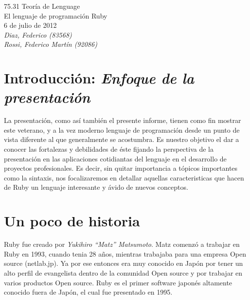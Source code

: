\documentclass{article}
\begin{document}
\begin{titlepage}
	\vspace*{\fill}
	\begin{center}
		\huge 75.31 Teoría de Lenguage \\ 
		\Huge El lenguaje de programación Ruby \\
		\bigskip \Large 6 de julio de 2012 \\
		\bigskip\bigskip \large\textit{Diaz, Federico (83568)\\Rossi, Federico Martín (92086)}
		\date{}
	\end{center}
	\vspace*{\fill}
\end{titlepage}
\newpage


\tableofcontents
\newpage


\section{Introducción: \textit{Enfoque de la presentación}}

La presentación, como así también el presente informe, tienen como fin mostrar este veterano, y a la vez moderno lenguaje de programación desde un punto de vista diferente al que generalmente se acostumbra. Es nuestro objetivo el dar a conocer las fortalezas y debilidades de éste fijando la perspectiva de la presentación en las aplicaciones cotidiantas del lenguaje en el desarrollo de proyectos profesionales. Es decir, sin quitar importancia a tópicos importantes como la sintaxis, nos focalizaremos en detallar aquellas caracteristicas que hacen de Ruby un lenguaje interesante y ávido de nuevos conceptos.
\bigskip




\section{Un poco de historia}

Ruby fue creado por \textit{Yukihiro ``Matz'' Matsumoto}. Matz comenzó a trabajar en Ruby en 1993, cuando tenia 28 años, mientras trabajaba para una empresa Open source (netlab.jp). Ya por ese entonces era muy conocido en Japón por tener un alto perfil de evangelista dentro de la comunidad Open source y por trabajar en varios productos Open source. Ruby es el primer software japonés altamente conocido fuera de Japón, el cual fue presentado en 1995.
\end{document}
